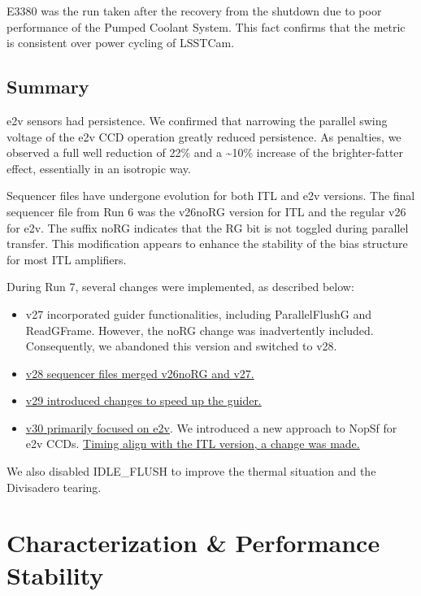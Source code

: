 E3380 was the run taken after the recovery from the shutdown due to poor performance of the Pumped Coolant System. This fact confirms that the metric is consistent over power cycling of LSSTCam.

\subsection{Summary}\label{summary:optimization}

e2v sensors had persistence. We confirmed that narrowing the parallel swing voltage of the e2v CCD operation greatly reduced persistence. As penalties, we observed a full well reduction of 22\% and a \textasciitilde10\% increase of the
brighter-fatter effect, essentially in an isotropic way.

Sequencer files have undergone evolution for both ITL and e2v versions.
The final sequencer file from Run 6 was the
v26noRG version for ITL and the regular v26
for e2v. The suffix noRG indicates that the
RG bit is not toggled during parallel transfer. This modification
appears to enhance the stability of the bias structure for most ITL
amplifiers.

During Run 7, several changes were implemented, as described below:

\begin{itemize}
\tightlist
\item
  v27 incorporated guider functionalities, including ParallelFlushG and
  ReadGFrame. However, the noRG change was inadvertently included.
  Consequently, we abandoned this version and switched to v28.
\item  \href{https://rubinobs.atlassian.net/browse/LSSTCAM-5}{v28 sequencer files merged v26noRG and
  v27.}
\item\href{https://rubinobs.atlassian.net/browse/LSSTCAM-34}{v29 introduced changes to speed up the guider.}
\item
  \href{https://github.com/lsst-camera-dh/sequencer-files/pull/17}{v30 primarily focused on e2v}. We introduced a new approach to NopSf
  for e2v CCDs. \href{https://github.com/lsst-camera-dh/sequencer-files/pull/18}{Timing align with the ITL version, a change was made.}
\end{itemize}

We also disabled IDLE\_FLUSH to improve the thermal situation and the Divisadero tearing.



\clearpage

\section{Characterization \& Performance Stability}\label{characterization-camera-stability}



